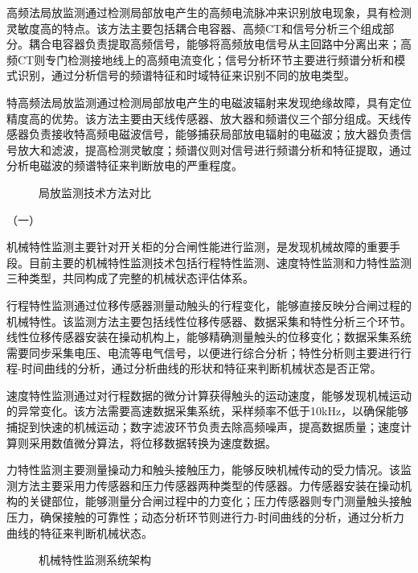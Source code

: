 高频法局放监测通过检测局部放电产生的高频电流脉冲来识别放电现象，具有检测灵敏度高的特点。该方法主要包括耦合电容器、高频CT和信号分析三个组成部分。耦合电容器负责提取高频信号，能够将高频放电信号从主回路中分离出来；高频CT则专门检测接地线上的高频电流变化；信号分析环节主要进行频谱分析和模式识别，通过分析信号的频谱特征和时域特征来识别不同的放电类型。

特高频法局放监测通过检测局部放电产生的电磁波辐射来发现绝缘故障，具有定位精度高的优势。该方法主要由天线传感器、放大器和频谱仪三个部分组成。天线传感器负责接收特高频电磁波信号，能够捕获局部放电辐射的电磁波；放大器负责信号放大和滤波，提高检测灵敏度；频谱仪则对信号进行频谱分析和特征提取，通过分析电磁波的频谱特征来判断放电的严重程度。

\begin{figure}[h]
\centering
\caption{局放监测技术方法对比}
\label{fig:pd_monitoring_methods}
\end{figure}

（一）

机械特性监测主要针对开关柜的分合闸性能进行监测，是发现机械故障的重要手段。目前主要的机械特性监测技术包括行程特性监测、速度特性监测和力特性监测三种类型，共同构成了完整的机械状态评估体系。

行程特性监测通过位移传感器测量动触头的行程变化，能够直接反映分合闸过程的机械特性。该监测方法主要包括线性位移传感器、数据采集和特性分析三个环节。线性位移传感器安装在操动机构上，能够精确测量触头的位移变化；数据采集系统需要同步采集电压、电流等电气信号，以便进行综合分析；特性分析则主要进行行程-时间曲线的分析，通过分析曲线的形状和特征来判断机械状态是否正常。

速度特性监测通过对行程数据的微分计算获得触头的运动速度，能够发现机械运动的异常变化。该方法需要高速数据采集系统，采样频率不低于10kHz，以确保能够捕捉到快速的机械运动；数字滤波环节负责去除高频噪声，提高数据质量；速度计算则采用数值微分算法，将位移数据转换为速度数据。

力特性监测主要测量操动力和触头接触压力，能够反映机械传动的受力情况。该监测方法主要采用力传感器和压力传感器两种类型的传感器。力传感器安装在操动机构的关键部位，能够测量分合闸过程中的力变化；压力传感器则专门测量触头接触压力，确保接触的可靠性；动态分析环节则进行力-时间曲线的分析，通过分析力曲线的特征来判断机械状态。

\begin{figure}[h]
\centering
\caption{机械特性监测系统架构}
\label{fig:mechanical_monitoring}
\end{figure}

